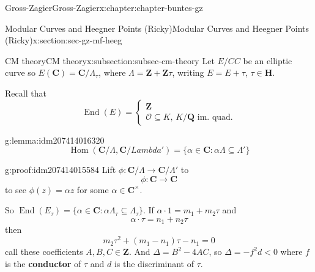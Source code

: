 \documentclass[oneside,10pt,]{book}
\newcommand{\terminology}[1]{\textbf{#1}}
\numberwithin{equation}{section}
\newcommand{\ZZ}{\mathbf{Z}}
\newcommand{\QQ}{\mathbf{Q}}
\newcommand{\CC}{\mathbf{C}}
\newcommand{\HH}{\mathbf{H}}
\newcommand{\ints}{\mathcal{O}}
\DeclareMathOperator{\End}{End}
\DeclareMathOperator{\Hom}{Hom}
\newcommand{\lt}{<}
\begin{document}
\begin{chapterptx}{Gross-Zagier}{}{Gross-Zagier}{}{}{x:chapter:chapter-buntes-gz}
%
%
\typeout{************************************************}
\typeout{************************************************}
%
\begin{sectionptx}{Modular Curves and Heegner Points (Ricky)}{}{Modular Curves and Heegner Points (Ricky)}{}{}{x:section:sec-gz-mf-heeg}
%
%
\typeout{************************************************}
\typeout{************************************************}
%
\begin{subsectionptx}{CM theory}{}{CM theory}{}{}{x:subsection:subsec-cm-theory}
Let \(E/CC\) be an elliptic curve so \(E(\CC) = \CC/\Lambda_\tau  \), where \(\Lambda  = \ZZ + \ZZ\tau \), writing \(E = E+\tau \), \(\tau  \in \HH\).%
\par
Recall that%
\begin{equation*}
\End(E) = \begin{cases} \ZZ \\ \ints \subseteq K ,\,K/\QQ \text{ im. quad.}\end{cases}
\end{equation*}
%
\begin{lemma}{}{}{g:lemma:idm207414016320}%
%
\begin{equation*}
\Hom(\CC/\Lambda ,\CC/Lambda')= \{\alpha \in \CC : \alpha  \Lambda  \subseteq \Lambda '\}
\end{equation*}
%
\end{lemma}
\begin{proofptx}{}{g:proof:idm207414015584}
Lift \(\phi  \colon \CC/\Lambda  \to \CC/\Lambda '\) to%
\begin{equation*}
\phi  \colon \CC  \to \CC
\end{equation*}
to see \(\phi (z) = \alpha  z\) for some \(\alpha  \in \CC^\times\).%
\end{proofptx}
So \(\End(E_\tau ) = \{\alpha \in \CC : \alpha  \Lambda _\tau  \subseteq \Lambda _\tau \}\). If \(\alpha  \cdot 1 = m_1 + m_2 \tau \) and%
\begin{equation*}
\alpha \cdot \tau  = n_1 + n_2 \tau 
\end{equation*}
then%
\begin{equation*}
m_2 \tau ^2 + (m_1 - n_1) \tau  - n_1 = 0
\end{equation*}
call these coefficients \(A,B,C \in \ZZ\). And \(\Delta = B^2 - 4AC\), so \(\Delta  = -f^2 d \lt 0\) where \(f\) is the \terminology{conductor} of \(\tau \) and \(d\) is the discriminant of \(\tau \).%
\par

\end{subsectionptx}
\end{sectionptx}
\end{chapterptx}
\end{document}
